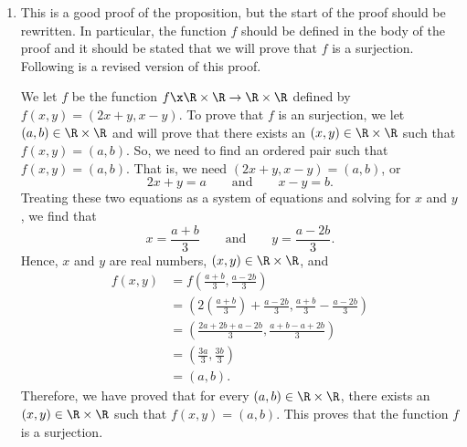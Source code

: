 \begin{enumerate}
\begin{enumerate}
\item This is a good proof of the proposition, but the start of the proof should be rewritten.  In particular, the function $f$ should be defined in the body of the proof and it should be stated that we will prove that $f$ is a surjection.  Following is a revised version of this proof.

\begin{myproof}
We let $f$ be the function $f\x\R \times \R \to \R \times \R$ defined by  
$f( {x, y} ) = ( {2x + y, x - y} )$.  To prove that $f$ is an surjection, we let 
$(a, b) \in \R \times \R$ and will prove that there exists an $(x, y) \in \R \times \R$ such that $f(x, y) = (a, b)$.  So, we need to find an ordered pair such that $f(x, y) = (a, b)$. That is, we need $(2x + y, x - y) = (a, b)$, or
\[
2x + y = a \qquad \text{and} \qquad x - y = b.
\]
Treating these two equations as a system of equations and solving for $x$ and $y$, we find that
\[
x = \frac{a + b}{3} \qquad \text{and} \qquad y = \frac{a - 2b}{3}.
\]
Hence, $x$ and $y$ are real numbers, $(x, y) \in \R \times \R$, and
\begin{align*}
f(x, y) &= f \left( \frac{a + b}{3}, \frac{a - 2b}{3} \right) \\
        &= \left(2 \left( \frac{a + b}{3} \right) + \frac{a - 2b}{3}, \frac{a + b}{3} - \frac{a - 2b}{3} \right) \\
        &= \left( \frac{2a + 2b + a - 2b}{3}, \frac{a + b - a + 2b}{3} \right) \\
        &= \left( \frac{3a}{3}, \frac{3b}{3} \right) \\
        &= (a, b).
\end{align*}
Therefore, we have proved that for every $(a, b) \in \R \times \R$, there exists an 
$(x, y) \in \R \times \R$ such that $f(x, y) = (a, b)$.  This proves that the function $f$ is a surjection.
\end{myproof}
\end{enumerate}
\end{enumerate}
\hbreak
\endinput
